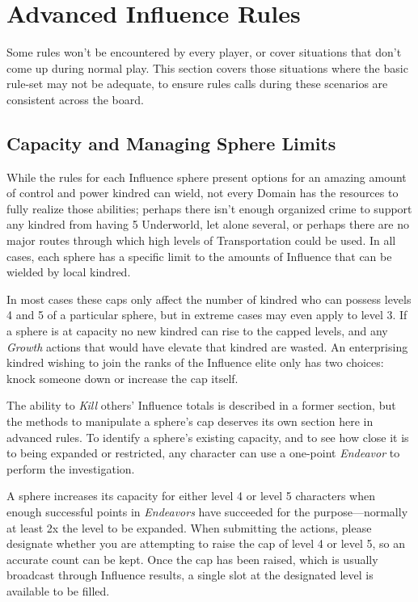 \section{Advanced Influence Rules}
Some rules won't be encountered by every player, or cover situations that don't come up during normal play.  
This section covers those situations where the basic rule-set may not be adequate, to ensure rules calls during 
these scenarios are consistent across the board.

\subsection{Capacity and Managing Sphere Limits}
While the rules for each Influence sphere present options for an amazing amount of control and power kindred 
can wield, not every Domain has the resources to fully realize those abilities; perhaps there isn't enough 
organized crime to support any kindred from having 5 Underworld, let alone several, or perhaps there are no major 
routes through which high levels of Transportation could be used.  In all cases, each sphere has a specific limit 
to the amounts of Influence that can be wielded by local kindred.

In most cases these caps only affect the number of kindred who can possess levels 4 and 5 of a particular sphere, 
but in extreme cases may even apply to level 3.  If a sphere is at capacity no new kindred can rise to the capped 
levels, and any \emph{Growth} actions that would have elevate that kindred are wasted.  An enterprising kindred 
wishing to join the ranks of the Influence elite only has two choices:  knock someone down or increase the cap itself.

The ability to \emph{Kill} others' Influence totals is described in a former section, but the methods to manipulate 
a sphere's cap deserves its own section here in advanced rules.  To identify a sphere's existing capacity, and to see 
how close it is to being expanded or restricted, any character can use a one-point \emph{Endeavor} to perform the 
investigation.

A sphere increases its capacity for either level 4 or level 5 characters when enough successful points in 
\emph{Endeavors} have succeeded for the purpose---normally at least 2x the level to be expanded.  When submitting 
the actions, please designate whether you are attempting to raise the cap of level 4 or level 5, so an accurate 
count can be kept.  Once the cap has been raised, which is usually broadcast through Influence results, a single 
slot at the designated level is available to be filled.

